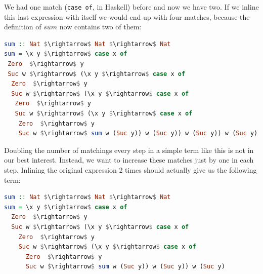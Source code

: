\documentclass[runningheads]{llncs}
\newcommand{\tN}{\mathbb{N}}
\begin{document}
\noindent We had one match ({\tt case of}, in Haskell) before and now we have two. If we 
inline this last expression with itself we would end up 
with four matches, because the definition of $sum$ now contains 
two of them:
\begin{lstlisting}[language=Haskell, mathescape=true]
sum :: Nat $\rightarrow$ Nat $\rightarrow$ Nat
sum = \x y $\rightarrow$ case x of 
 Zero  $\rightarrow$ y
 Suc w $\rightarrow$ (\x y $\rightarrow$ case x of 
  Zero  $\rightarrow$ y
  Suc w $\rightarrow$ (\x y $\rightarrow$ case x of 
   Zero  $\rightarrow$ y
   Suc w $\rightarrow$ (\x y $\rightarrow$ case x of 
    Zero  $\rightarrow$ y
    Suc w $\rightarrow$ sum w (Suc y)) w (Suc y)) w (Suc y)) w (Suc y)
\end{lstlisting}

\noindent Doubling the number of 
matchings every step in a simple term like this 
is not in our best interest.
Instead, we want to increase these matches just by 
one in each step. Inlining the original expression 2 
times should actually give us the following term:

\begin{lstlisting}[language=Haskell, mathescape=true]
sum :: Nat $\rightarrow$ Nat $\rightarrow$ Nat
sum = \x y $\rightarrow$ case x of 
  Zero  $\rightarrow$ y
  Suc w $\rightarrow$ (\x y $\rightarrow$ case x of 
    Zero  $\rightarrow$ y
    Suc w $\rightarrow$ (\x y $\rightarrow$ case x of 
      Zero  $\rightarrow$ y
      Suc w $\rightarrow$ sum w (Suc y)) w (Suc y)) w (Suc y)
  \end{lstlisting}
\end{document}
